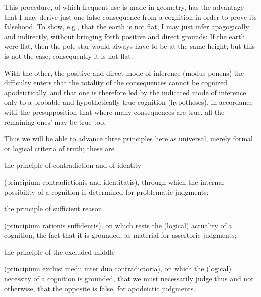         This procedure, of which frequent use is made in geometry,
        has the advantage that I may derive just one false consequence
        from a cognition in order to prove its falsehood.
        To show, e.g., that the earth is not flat, I may
        just infer apagogically and indirectly,
        without bringing forth positive and direct grounds:
        If the earth were flat, then the pole star would
        always have to be at the same height;
        but this is not the case, consequently it is not flat.

    With the other, the positive and direct mode of inference (modus ponens)
    the difficulty enters that the totality of the consequences cannot be
    cognized apodeictically, and that one is therefore led by the indicated
    mode of inference only to a probable and hypothetically true cognition
    (hypotheses), in accordance witii the presupposition that where many
    consequences are true, all the remaining ones' may be true too.

    Thus we will be able to advance three principles here as universal,
    merely formal or logical criteria of truth; these are

    the principle of contradiction and of identity

    (principium contradictionis and identitatis),
    through which the internal possibility of a cognition
    is determined for problematic judgments;

    the principle of sufficient reason

    (principium rationis suffidentis),
    on which rests the (logical) actuality of a cognition,
    the fact that it is grounded, as material for assertoric judgments;

    the principle of the excluded middle

    (principium exclusi medii inter duo contradictoria),
    on which the (logical) necessity of a cognition is grounded,
    that we must necessarily judge thus and not otherwise,
    that the opposite is false, for apodeictic judgments.

